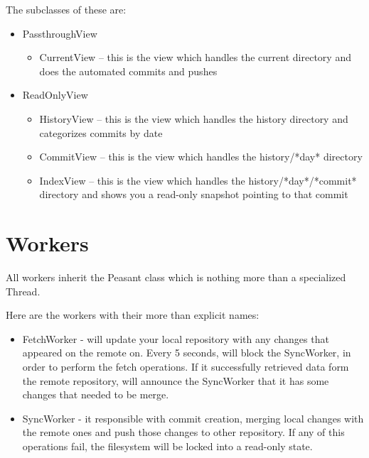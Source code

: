 The subclasses of these are:

\begin{itemize}
    \item PassthroughView
    \begin{itemize}
        \item CurrentView – this is the view which handles the current directory and does the automated commits and pushes
    \end{itemize}
    
    \item ReadOnlyView
    \begin{itemize}
        \item HistoryView – this is the view which handles the history directory and categorizes commits by date
        \item CommitView – this is the view which handles the history/*day* directory
        \item IndexView – this is the view which handles the history/*day*/*commit* directory and shows you a read-only snapshot pointing to that commit
    \end{itemize}
\end{itemize}

\section{Workers}
    All workers inherit the Peasant class which is nothing more than a specialized Thread.

    Here are the workers with their more than explicit names:
    \begin{itemize}
        \item FetchWorker - will update your local repository with any changes that appeared on the remote on. Every 5 seconds, will block the SyncWorker, in order to perform the fetch operations. If it successfully retrieved data form the remote repository, will announce the SyncWorker that it has some changes that needed to be merge.
        \item SyncWorker - it responsible with commit creation, merging local changes with the remote ones and push those changes to other repository. If any of this operations fail, the filesystem will be locked into a read-only state.
    \end{itemize}
    
